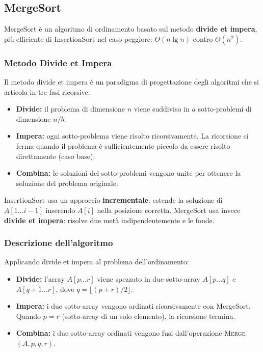 \pagebreak

\subsection{MergeSort}

MergeSort è un algoritmo di ordinamento basato sul metodo \textbf{divide et impera},
più efficiente di InsertionSort nel caso peggiore: $\Theta(n \lg n)$ contro $\Theta(n^2)$.

\subsubsection{Metodo Divide et Impera}

Il metodo divide et impera è un paradigma di progettazione degli algoritmi
che si articola in tre fasi ricorsive:

\begin{itemize}
	\item \textbf{Divide:} il problema di dimensione $n$ viene suddiviso
	in $a$ sotto-problemi di dimensione $n/b$.
	\item \textbf{Impera:} ogni sotto-problema viene risolto ricorsivamente.
	La ricorsione si ferma quando il problema è sufficientemente piccolo
	da essere risolto direttamente (caso base).
	\item \textbf{Combina:} le soluzioni dei sotto-problemi vengono
	unite per ottenere la soluzione del problema originale.
\end{itemize}

\begin{nota}
	InsertionSort usa un approccio \textbf{incrementale}: estende la
	soluzione di $A[1 \ldots i-1]$ inserendo $A[i]$ nella posizione corretta.
	MergeSort usa invece \textbf{divide et impera}: risolve due metà
	indipendentemente e le fonde.
\end{nota}

\subsubsection{Descrizione dell'algoritmo}

Applicando divide et impera al problema dell'ordinamento:

\begin{itemize}
	\item \textbf{Divide:} l'array $A[p \ldots r]$ viene spezzato in due
	sotto-array $A[p \ldots q]$ e $A[q+1 \ldots r]$, dove
	$q = \lfloor (p+r)/2 \rfloor$.
	\item \textbf{Impera:} i due sotto-array vengono ordinati ricorsivamente
	con MergeSort. Quando $p = r$ (sotto-array di un solo elemento),
	la ricorsione termina.
	\item \textbf{Combina:} i due sotto-array ordinati vengono fusi
	dall'operazione \textsc{Merge}$(A, p, q, r)$.
\end{itemize}

